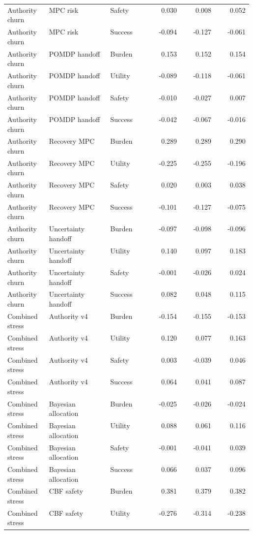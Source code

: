 \documentclass{article}
\begin{document}
\begin{center}
\begin{longtable}{p{0.17\linewidth}p{0.25\linewidth}p{0.16\linewidth}rrr}
Authority churn & MPC risk & Safety & 0.030 & 0.008 & 0.052\\
Authority churn & MPC risk & Success & -0.094 & -0.127 & -0.061\\
Authority churn & POMDP handoff & Burden & 0.153 & 0.152 & 0.154\\
Authority churn & POMDP handoff & Utility & -0.089 & -0.118 & -0.061\\
Authority churn & POMDP handoff & Safety & -0.010 & -0.027 & 0.007\\
Authority churn & POMDP handoff & Success & -0.042 & -0.067 & -0.016\\
Authority churn & Recovery MPC & Burden & 0.289 & 0.289 & 0.290\\
Authority churn & Recovery MPC & Utility & -0.225 & -0.255 & -0.196\\
Authority churn & Recovery MPC & Safety & 0.020 & 0.003 & 0.038\\
Authority churn & Recovery MPC & Success & -0.101 & -0.127 & -0.075\\
Authority churn & Uncertainty handoff & Burden & -0.097 & -0.098 & -0.096\\
Authority churn & Uncertainty handoff & Utility & 0.140 & 0.097 & 0.183\\
Authority churn & Uncertainty handoff & Safety & -0.001 & -0.026 & 0.024\\
Authority churn & Uncertainty handoff & Success & 0.082 & 0.048 & 0.115\\
Combined stress & Authority v4 & Burden & -0.154 & -0.155 & -0.153\\
Combined stress & Authority v4 & Utility & 0.120 & 0.077 & 0.163\\
Combined stress & Authority v4 & Safety & 0.003 & -0.039 & 0.046\\
Combined stress & Authority v4 & Success & 0.064 & 0.041 & 0.087\\
Combined stress & Bayesian allocation & Burden & -0.025 & -0.026 & -0.024\\
Combined stress & Bayesian allocation & Utility & 0.088 & 0.061 & 0.116\\
Combined stress & Bayesian allocation & Safety & -0.001 & -0.041 & 0.039\\
Combined stress & Bayesian allocation & Success & 0.066 & 0.037 & 0.096\\
Combined stress & CBF safety & Burden & 0.381 & 0.379 & 0.382\\
Combined stress & CBF safety & Utility & -0.276 & -0.314 & -0.238\\

\end{longtable}
\end{center}
\end{document}
